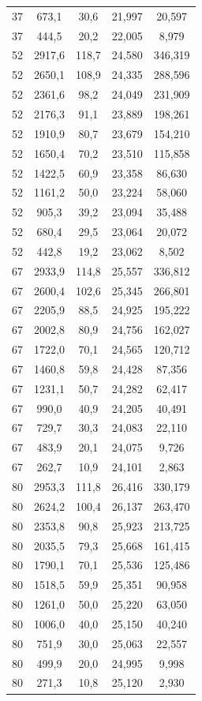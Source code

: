 \documentclass[a4paper,12pt]{article}
\begin{document}
\begin{longtable}{ccccc}
37 & 673{,}1 & 30{,}6 & 21{,}997 & 20{,}597 \\
37 & 444{,}5 & 20{,}2 & 22{,}005 & 8{,}979 \\
52 & 2917{,}6 & 118{,}7 & 24{,}580 & 346{,}319 \\
52 & 2650{,}1 & 108{,}9 & 24{,}335 & 288{,}596 \\
52 & 2361{,}6 & 98{,}2 & 24{,}049 & 231{,}909 \\
52 & 2176{,}3 & 91{,}1 & 23{,}889 & 198{,}261 \\
52 & 1910{,}9 & 80{,}7 & 23{,}679 & 154{,}210 \\
52 & 1650{,}4 & 70{,}2 & 23{,}510 & 115{,}858 \\
52 & 1422{,}5 & 60{,}9 & 23{,}358 & 86{,}630 \\
52 & 1161{,}2 & 50{,}0 & 23{,}224 & 58{,}060 \\
52 & 905{,}3 & 39{,}2 & 23{,}094 & 35{,}488 \\
52 & 680{,}4 & 29{,}5 & 23{,}064 & 20{,}072 \\
52 & 442{,}8 & 19{,}2 & 23{,}062 & 8{,}502 \\
67 & 2933{,}9 & 114{,}8 & 25{,}557 & 336{,}812 \\
67 & 2600{,}4 & 102{,}6 & 25{,}345 & 266{,}801 \\
67 & 2205{,}9 & 88{,}5 & 24{,}925 & 195{,}222 \\
67 & 2002{,}8 & 80{,}9 & 24{,}756 & 162{,}027 \\
67 & 1722{,}0 & 70{,}1 & 24{,}565 & 120{,}712 \\
67 & 1460{,}8 & 59{,}8 & 24{,}428 & 87{,}356 \\
67 & 1231{,}1 & 50{,}7 & 24{,}282 & 62{,}417 \\
67 & 990{,}0 & 40{,}9 & 24{,}205 & 40{,}491 \\
67 & 729{,}7 & 30{,}3 & 24{,}083 & 22{,}110 \\
67 & 483{,}9 & 20{,}1 & 24{,}075 & 9{,}726 \\
67 & 262{,}7 & 10{,}9 & 24{,}101 & 2{,}863 \\
80 & 2953{,}3 & 111{,}8 & 26{,}416 & 330{,}179 \\
80 & 2624{,}2 & 100{,}4 & 26{,}137 & 263{,}470 \\
80 & 2353{,}8 & 90{,}8 & 25{,}923 & 213{,}725 \\
80 & 2035{,}5 & 79{,}3 & 25{,}668 & 161{,}415 \\
80 & 1790{,}1 & 70{,}1 & 25{,}536 & 125{,}486 \\
80 & 1518{,}5 & 59{,}9 & 25{,}351 & 90{,}958 \\
80 & 1261{,}0 & 50{,}0 & 25{,}220 & 63{,}050 \\
80 & 1006{,}0 & 40{,}0 & 25{,}150 & 40{,}240 \\
80 & 751{,}9 & 30{,}0 & 25{,}063 & 22{,}557 \\
80 & 499{,}9 & 20{,}0 & 24{,}995 & 9{,}998 \\
80 & 271{,}3 & 10{,}8 & 25{,}120 & 2{,}930 \\
\bottomrule
\end{longtable}
\end{document}
